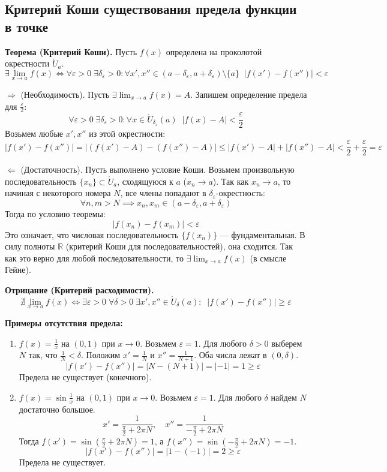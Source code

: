 \subsection{Критерий Коши существования предела функции в точке}

\textbf{Теорема (Критерий Коши).} Пусть $f(x)$ определена на проколотой окрестности $\mathring U_a$.
\[ \exists \lim_{x \to a} f(x) \Leftrightarrow \forall \varepsilon > 0\; \exists \delta_\varepsilon > 0: \forall x', x'' \in (a - \delta_\varepsilon, a + \delta_\varepsilon) \setminus \{a\}\;\; |f(x') - f(x'')| < \varepsilon \]

\begin{tcolorbox}[title=Доказательство]
	$\Rightarrow$ (Необходимость). Пусть $\exists \lim_{x \to a} f(x) = A$.
	Запишем определение предела для $\frac{\varepsilon}{2}$:
	\[ \forall \varepsilon > 0\; \exists \delta_\varepsilon > 0: \forall x \in \mathring U_{\delta_\varepsilon}(a) \;\; |f(x) - A| < \frac{\varepsilon}{2} \]
	Возьмем любые $x', x''$ из этой окрестности:
	\[ |f(x') - f(x'')| = |(f(x') - A) - (f(x'') - A)| \leq |f(x') - A| + |f(x'') - A| < \frac{\varepsilon}{2} + \frac{\varepsilon}{2} = \varepsilon \]
	
	$\Leftarrow$ (Достаточность). Пусть выполнено условие Коши.
	Возьмем произвольную последовательность $\{x_n\} \subset \mathring U_a$, сходящуюся к $a$ ($x_n \to a$).
	Так как $x_n \to a$, то начиная с некоторого номера $N$, все члены попадают в $\delta_\varepsilon$-окрестность:
	\[ \forall n, m > N \implies x_n, x_m \in (a - \delta_\varepsilon, a + \delta_\varepsilon) \]
	Тогда по условию теоремы:
	\[ |f(x_n) - f(x_m)| < \varepsilon \]
	Это означает, что числовая последовательность $\{f(x_n)\}$ — фундаментальная.
	В силу полноты $\mathbb{R}$ (критерий Коши для последовательностей), она сходится.
	Так как это верно для любой последовательности, то $\exists \lim_{x\to a} f(x)$ (в смысле Гейне).
\end{tcolorbox}

\textbf{Отрицание (Критерий расходимости).}
\[ \nexists \lim_{x \to a} f(x) \Leftrightarrow \exists \varepsilon > 0\; \forall \delta > 0\; \exists x', x'' \in \mathring U_\delta(a): \;\; |f(x') - f(x'')| \geq \varepsilon \]

\textbf{Примеры отсутствия предела:}
\begin{enumerate}
	\item $f(x) = \frac{1}{x}$ на $(0, 1)$ при $x \to 0$.
	Возьмем $\varepsilon = 1$. Для любого $\delta > 0$ выберем $N$ так, что $\frac{1}{N} < \delta$.
	Положим $x' = \frac{1}{N}$ и $x'' = \frac{1}{N+1}$. Оба числа лежат в $(0, \delta)$.
	\[ |f(x') - f(x'')| = |N - (N+1)| = |-1| = 1 \ge \varepsilon \]
	Предела не существует (конечного).

	\item $f(x) = \sin \frac{1}{x}$ на $(0, 1)$ при $x \to 0$.
	Возьмем $\varepsilon = 1$. Для любого $\delta$ найдем $N$ достаточно большое.
	\[ x' = \frac{1}{\frac{\pi}{2} + 2\pi N}, \quad x'' = \frac{1}{-\frac{\pi}{2} + 2\pi N} \]
	Тогда $f(x') = \sin(\frac{\pi}{2} + 2\pi N) = 1$, а $f(x'') = \sin(-\frac{\pi}{2} + 2\pi N) = -1$.
	\[ |f(x') - f(x'')| = |1 - (-1)| = 2 \ge \varepsilon \]
	Предела не существует.
\end{enumerate}
